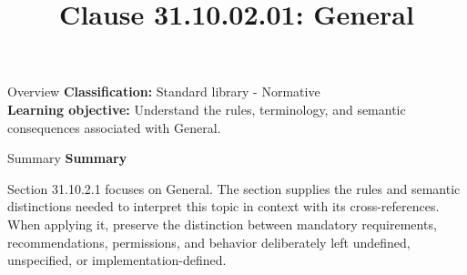 \documentclass[10pt,letterpaper]{article}
\title{Clause 31.10.02.01: General}
\author{}
\date{}
\begin{document}
\maketitle
\begin{CornellOverviewBox}{Overview}
\textbf{Classification:} Standard library - Normative\\[2pt]
\textbf{Learning objective:} Understand the rules, terminology, and semantic consequences associated with General.
\end{CornellOverviewBox}\begin{CornellSummaryBox}{Summary}
{\sffamily\bfseries\color{Accent} Summary}\par\vspace{3pt}Section 31.10.2.1 focuses on General. The section supplies the rules and semantic distinctions needed to interpret this topic in context with its cross-references. When applying it, preserve the distinction between mandatory requirements, recommendations, permissions, and behavior deliberately left undefined, unspecified, or implementation-defined.
\end{CornellSummaryBox}
\end{document}
